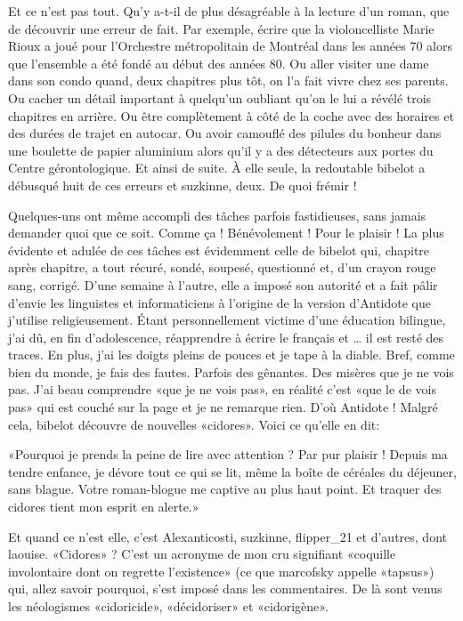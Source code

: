\begin{Postface}
Et ce n’est pas tout. Qu’y a-t-il de plus désagréable à la lecture d’un roman, que de découvrir une erreur de fait. Par exemple, écrire que la violoncelliste Marie Rioux a joué pour l’Orchestre métropolitain de Montréal dans les années 70 alors que l’ensemble a été fondé au début des années 80. Ou aller visiter une dame dans son condo quand, deux chapitres plus tôt, on l’a fait vivre chez ses parents. Ou cacher un détail important à quelqu’un oubliant qu’on le lui a révélé trois chapitres en arrière. Ou être complètement à côté de la coche avec des horaires et des durées de trajet en autocar. Ou avoir camouflé des pilules du bonheur dans une boulette de papier aluminium alors qu’il y a des détecteurs aux portes du Centre gérontologique. Et ainsi de suite. À elle seule, la redoutable bibelot a débusqué huit de ces erreurs et suzkinne, deux. De quoi frémir !

Quelques-uns ont même accompli des tâches parfois fastidieuses, sans jamais demander quoi que ce soit. Comme ça ! Bénévolement ! Pour le plaisir ! La plus évidente et adulée de ces tâches est évidemment celle de bibelot qui, chapitre après chapitre, a tout récuré, sondé, soupesé, questionné et, d’un crayon rouge sang, corrigé. D’une semaine à l’autre, elle a imposé son autorité et a fait pâlir d’envie les linguistes et informaticiens à l’origine de la version d’Antidote que j’utilise religieusement. Étant personnellement victime d’une éducation bilingue, j’ai dû, en fin d’adolescence, réapprendre à écrire le français et … il est resté des traces. En plus, j’ai les doigts pleins de pouces et je tape à la diable. Bref, comme bien du monde, je fais des fautes. Parfois des gênantes. Des misères que je ne vois pas. J’ai beau comprendre «que je ne vois pas», en réalité c’est «que le de vois pas» qui est couché sur la page et je ne remarque rien. D’où Antidote ! Malgré cela, bibelot découvre de nouvelles «cidores». Voici ce qu’elle en dit:

    «Pourquoi je prends la peine de lire avec attention ? Par pur plaisir ! Depuis ma tendre enfance, je dévore tout ce qui se lit, même la boîte de céréales du déjeuner, sans blague. Votre roman-blogue me captive au plus haut point. Et traquer des cidores tient mon esprit en alerte.»

Et quand ce n’est elle, c’est Alexanticosti, suzkinne, flipper_21 et d’autres, dont laouise. «Cidores» ? C’est un acronyme de mon cru signifiant «coquille involontaire dont on regrette l’existence» (ce que marcofsky appelle «tapsus») qui, allez savoir pourquoi, s’est imposé dans les commentaires. De là sont venus les néologismes «cidoricide», «décidoriser» et «cidorigène».


\end{Postface}

